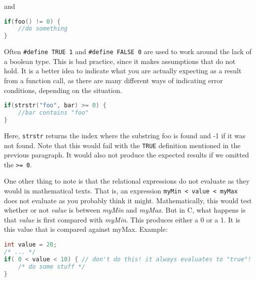 and
\lstset{basicstyle=\scriptsize, numbers=left, captionpos=b, tabsize=4}
\begin{lstlisting}[caption=Section \thesection listing \arabic{controlcnt},language={C},
breaklines=true,xleftmargin=15pt, label=lst:section\thesection listing\arabic{controlcnt}]
if(foo() != 0) {
	//do something
}
\end{lstlisting}

Often \texttt{\#define TRUE 1} and \texttt{\#define FALSE 0} are used to work
around the lack of a boolean type. This is bad practice, since it makes
assumptions that do not hold. It is a better idea to indicate what you are
actually expecting as a result from a function call, as there are many
different ways of indicating error conditions, depending on the situation.
\lstset{basicstyle=\scriptsize, numbers=left, captionpos=b, tabsize=4}
\begin{lstlisting}[caption=Section \thesection listing \arabic{controlcnt},language={C},
breaklines=true,xleftmargin=15pt, label=lst:section\thesection listing\arabic{controlcnt}]
if(strstr("foo", bar) >= 0) {
	//bar contains "foo"
}
\end{lstlisting}

Here, \texttt{strstr} returns the index where the substring foo is found and -1
if it was not found. Note that this would fail with the \texttt{TRUE}
definition mentioned in the previous paragraph. It would also not produce the
expected results if we omitted the \texttt{\textgreater{}= 0}.

One other thing to note is that the relational expressions do not evaluate as
they would in mathematical texts. That is, an expression \texttt{myMin
\textless{} value \textless{} myMax} does not evaluate as you probably think it
might. Mathematically, this would test whether or not \emph{value} is between
\emph{myMin} and \emph{myMax}. But in C, what happens is that \emph{value} is
first compared with \emph{myMin}. This produces either a 0 or a 1. It is this
value that is compared against myMax. Example:
\lstset{basicstyle=\scriptsize, numbers=left, captionpos=b, tabsize=4}
\begin{lstlisting}[caption=Section \thesection listing \arabic{controlcnt},language={C},
breaklines=true,xleftmargin=15pt, label=lst:section\thesection listing\arabic{controlcnt}]
int value = 20;
/* ... */
if( 0 < value < 10) { // don't do this! it always evaluates to "true"!
	/* do some stuff */
}
\end{lstlisting}

